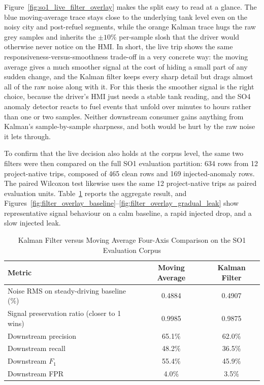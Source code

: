 Figure~\ref{fig:so1_live_filter_overlay} makes the split easy to read at a glance. The blue moving-average trace stays close to the underlying tank level even on the noisy city and post-refuel segments, while the orange Kalman trace hugs the raw grey samples and inherits the $\pm 10\%$ per-sample slosh that the driver would otherwise never notice on the HMI. In short, the live trip shows the same responsiveness-versus-smoothness trade-off in a very concrete way: the moving average gives a much smoother signal at the cost of hiding a small part of any sudden change, and the Kalman filter keeps every sharp detail but drags almost all of the raw noise along with it. For this thesis the smoother signal is the right choice, because the driver's HMI just needs a stable tank reading, and the SO4 anomaly detector reacts to fuel events that unfold over minutes to hours rather than one or two samples. Neither downstream consumer gains anything from Kalman's sample-by-sample sharpness, and both would be hurt by the raw noise it lets through.

\FloatBarrier

To confirm that the live decision also holds at the corpus level, the same two filters were then compared on the full SO1 evaluation partition: 634 rows from 12 project-native trips, composed of 465 clean rows and 169 injected-anomaly rows. The paired Wilcoxon test likewise uses the same 12 project-native trips as paired evaluation units. Table~\ref{tab:filter_comparison_four_axes} reports the aggregate result, and Figures~\ref{fig:filter_overlay_baseline}--\ref{fig:filter_overlay_gradual_leak} show representative signal behaviour on a calm baseline, a rapid injected drop, and a slow injected leak.

\begin{table}[!htbp]
\centering
\caption{Kalman Filter versus Moving Average \textemdash{} Four-Axis Comparison on the SO1 Evaluation Corpus}
\label{tab:filter_comparison_four_axes}
\small
\begin{tabular}{|p{}|c|c|}
\hline
\textbf{Metric} & \textbf{Moving Average} & \textbf{Kalman Filter} \\
\hline
Noise RMS on steady-driving baseline (\%)                 & 0.4884 & 0.4907 \\
\hline
Signal preservation ratio (closer to 1 wins)              & 0.9985 & 0.9875 \\
\hline
Downstream precision                                       & 65.1\% & 62.0\% \\
\hline
Downstream recall                                          & 48.2\% & 36.5\% \\
\hline
Downstream $F_1$                                           & 55.4\% & 45.9\% \\
\hline
Downstream FPR                                             & 4.0\% & 3.5\% \\
\hline
\end{tabular}
\end{table}

